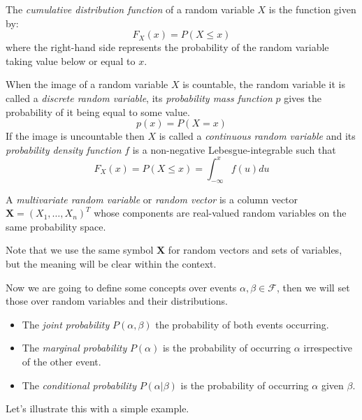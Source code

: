 \begin{definition}
The \emph{cumulative distribution function} of a random variable \(X\) is the
function given by:
\[
F_X (x) = P(X \leq x)
\]
where the right-hand side represents the probability of the random variable
taking value below or equal to \(x\).
\end{definition}

\begin{definition}
When the image of a random variable \(X\) is countable, the random variable it
is called a
\emph{discrete random variable}, its \emph{probability mass function} \(p\) gives the
probability of it being equal to some value.
\[
p(x) = P(X = x)
\]
If the image is uncountable then \(X\) is called a \emph{continuous random
  variable} and its \emph{probability density function} \(f\) is a non-negative
Lebesgue-integrable such that
\[
F_X(x) = P(X \leq x) = \int_{-\infty}^x f(u) du
\]
\end{definition}


\begin{definition}
  A \emph{multivariate random variable} or \emph{random vector} is a column vector \(\bm{X} =
  (X_1,\dots,X_n)^T\) whose components are real-valued random variables on the
  same probability space.

  Note that we use the same symbol \(\bm{X}\) for random vectors and sets of
  variables, but the meaning will be clear within the context.
\end{definition}

Now we are going to define some concepts over events \(\alpha, \beta \in \mathcal{F}\), then we will set those
over random variables and their distributions.

\begin{itemize}
\item The \emph{joint probability} \(P(\alpha, \beta)\) the probability of both
  events occurring.
\item The \emph{marginal probability} \(P(\alpha)\) is the probability of occurring
\(\alpha\) irrespective of the other event.
\item The \emph{conditional
  probability} \(P(\alpha | \beta)\) is the probability of occurring \(\alpha\)
given \(\beta\).
\end{itemize}

Let's illustrate this with a simple example.

